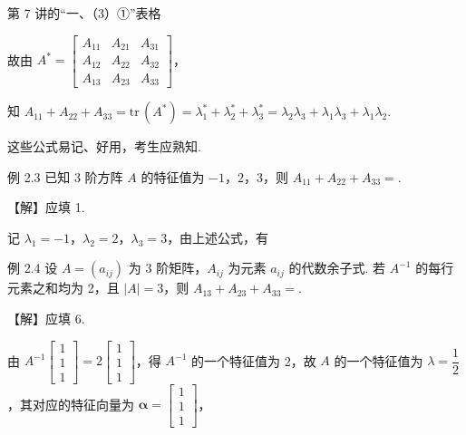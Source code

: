 第 7 讲的“一、（3）①”表格

故由 $A^{*}=\begin{bmatrix}A_{11}&A_{21}&A_{31}\\A_{12}&A_{22}&A_{32}\\A_{13}&A_{23}&A_{33}\end{bmatrix}$，

知 $A_{11}+A_{22}+A_{33}=\mathrm{tr}\,(A^{*})=\lambda_1^{*}+\lambda_2^{*}+\lambda_3^{*}=\lambda_2\lambda_3+\lambda_1\lambda_3+\lambda_1\lambda_2$.

这些公式易记、好用，考生应熟知.

\begin{fcard}{例 2.3}
已知 3 阶方阵 $A$ 的特征值为 $-1$，$2$，$3$，则 $A_{11}+A_{22}+A_{33}=$\underline{\hspace{2.6em}}.
\end{fcard}

【解】应填 1.

记 $\lambda_1=-1$，$\lambda_2=2$，$\lambda_3=3$，由上述公式，有

\begin{fcard}{例 2.4}
设 $A=(a_{ij})$ 为 3 阶矩阵，$A_{ij}$ 为元素 $a_{ij}$ 的代数余子式. 若 $A^{-1}$ 的每行元素之和均为 2，且 $|A|=3$，则 $A_{13}+A_{23}+A_{33}=$\underline{\hspace{2.6em}}.
\end{fcard}

【解】应填 6.

由 $A^{-1}\begin{bmatrix}1\\1\\1\end{bmatrix}=2\begin{bmatrix}1\\1\\1\end{bmatrix}$，得 $A^{-1}$ 的一个特征值为 2，故 $A$ 的一个特征值为 $\lambda=\dfrac{1}{2}$，其对应的特征向量为 $\boldsymbol{\alpha}=\begin{bmatrix}1\\1\\1\end{bmatrix}$，

